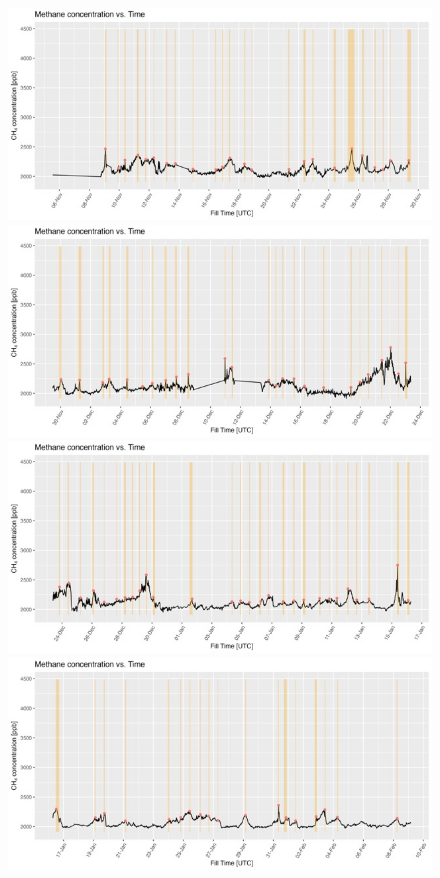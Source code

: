 \begin{figure} 
\centering
    \includegraphics[width=.8\textwidth]{figures/Appendix/CH4_Timelines/MediumPeakTimeline/4_CH4_Timeline4_Medium_Peaks Medium.jpeg}
    \\[\smallskipamount]
    \includegraphics[width=.8\textwidth]{figures/Appendix/CH4_Timelines/MediumPeakTimeline/4_CH4_Timeline5_Medium_Peaks Medium.jpeg}
    \\[\smallskipamount]
    \includegraphics[width=.8\textwidth]{figures/Appendix/CH4_Timelines/MediumPeakTimeline/4_CH4_Timeline6_Medium_Peaks Medium.jpeg}
    \\[\smallskipamount]
    \includegraphics[width=.8\textwidth]{figures/Appendix/CH4_Timelines/MediumPeakTimeline/4_CH4_Timeline7_Medium_Peaks Medium.jpeg}
\end{figure}
